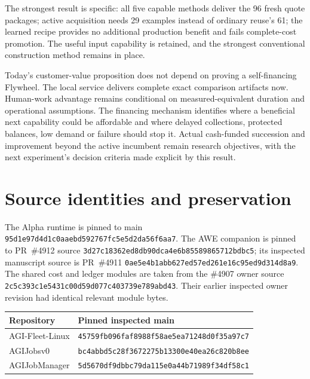 \documentclass[11pt,letterpaper]{article}
\newcommand{\code}[1]{\texttt{\small #1}}
\begin{document}
The strongest result is specific: all five capable methods deliver the 96 fresh quote packages; active acquisition needs 29 examples instead of ordinary reuse's 61; the learned recipe provides no additional production benefit and fails complete-cost promotion. The useful input capability is retained, and the strongest conventional construction method remains in place.

Today's customer-value proposition does not depend on proving a self-financing Flywheel. The local service delivers complete exact comparison artifacts now. Human-work advantage remains conditional on measured-equivalent duration and operational assumptions. The financing mechanism identifies where a beneficial next capability could be affordable and where delayed collections, protected balances, low demand or failure should stop it. Actual cash-funded succession and improvement beyond the active incumbent remain research objectives, with the next experiment's decision criteria made explicit by this result.

\clearpage
\appendix
\section{Source identities and preservation}

The Alpha runtime is pinned to main \code{95d1e97d4d1c0aaebd592767fc5e5d2da56f6aa7}. The AWE companion is pinned to PR~\#4912 source \code{3d27c18362ed8db90dca4e6b85589865712bdbc5}; its inspected manuscript source is PR~\#4911 \code{0ae5e4b1abb627ed57ed261e16c95ed9d314d8a9}. The shared cost and ledger modules are taken from the \#4907 owner source \code{2c5c393c1e5431c00d59d077c403739e789abd43}. Their earlier inspected owner revision had identical relevant module bytes.

\begin{tabularx}{\textwidth}{@{}P{.24\textwidth}Y@{}}\toprule
Repository & Pinned inspected main\\\midrule
AGI-Fleet-Linux & \nolinkurl{45759fb096faf8988f58ae5ea71248d0f35a97c7}\\
AGIJobsv0 & \nolinkurl{bc4abbd5c28f3672275b13300e40ea26c820b8ee}\\
AGIJobManager & \nolinkurl{5d5670df9dbbc79da115e0a44b71989f34df58c1}\\\bottomrule
\end{tabularx}
\end{document}
